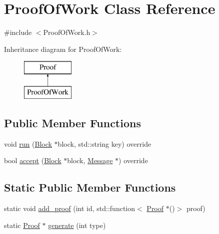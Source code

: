 \hypertarget{classProofOfWork}{}\section{Proof\+Of\+Work Class Reference}
\label{classProofOfWork}


{\ttfamily \#include $<$Proof\+Of\+Work.\+h$>$}

Inheritance diagram for Proof\+Of\+Work\+:\begin{figure}[H]
\begin{center}
\leavevmode
\includegraphics[height=2.000000cm]{classProofOfWork}
\end{center}
\end{figure}
\subsection*{Public Member Functions}
\begin{DoxyCompactItemize}
\item 
void \mbox{\hyperlink{classProofOfWork_a80cbd012ee3f9e92a8497efac84bf689}{run}} (\mbox{\hyperlink{classBlock}{Block}} $\ast$block, std\+::string key) override
\item 
bool \mbox{\hyperlink{classProofOfWork_abe3dba92dad383eec07f70acccaa802d}{accept}} (\mbox{\hyperlink{classBlock}{Block}} $\ast$block, \mbox{\hyperlink{classMessage}{Message}} $\ast$) override
\end{DoxyCompactItemize}
\subsection*{Static Public Member Functions}
\begin{DoxyCompactItemize}
\item 
static void \mbox{\hyperlink{classProof_a71874539fdbcc93c15594b889c95225b}{add\+\_\+proof}} (int id, std\+::function$<$ \mbox{\hyperlink{classProof}{Proof}} $\ast$()$>$ proof)
\item 
static \mbox{\hyperlink{classProof}{Proof}} $\ast$ \mbox{\hyperlink{classProof_a267f0f4587babb59884b5f280e2d54c8}{generate}} (int type)
\end{DoxyCompactItemize}
